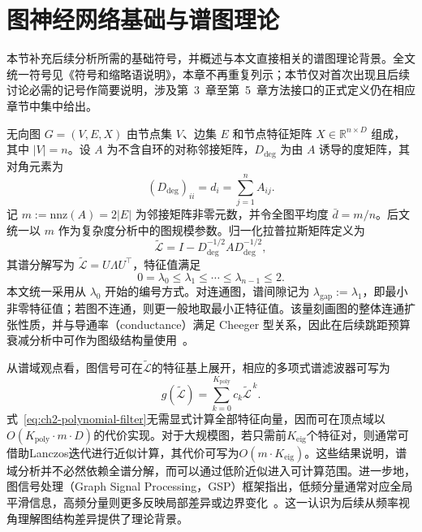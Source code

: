 \section{图神经网络基础与谱图理论}
\label{sec:ch2-gnn-basics}

本节补充后续分析所需的基础符号，并概述与本文直接相关的谱图理论背景。全文统一符号见《符号和缩略语说明》，本章不再重复列示；本节仅对首次出现且后续讨论必需的记号作简要说明，涉及第~3~章至第~5~章方法接口的正式定义仍在相应章节中集中给出。

无向图 \(G=(V,E,X)\) 由节点集 \(V\)、边集 \(E\) 和节点特征矩阵
\(X\in\mathbb{R}^{n\times D}\) 组成，其中 \(|V|=n\)。设 \(A\) 为不含自环的对称邻接矩阵，\(D_{\mathrm{deg}}\) 为由 \(A\) 诱导的度矩阵，其对角元素为
\begin{equation}
  (D_{\mathrm{deg}})_{ii}=d_i=\sum_{j=1}^{n} A_{ij}.
  \label{eq:ch2-degree-matrix}
\end{equation}
记 \(m:=\mathrm{nnz}(A)=2|E|\) 为邻接矩阵非零元数，并令全图平均度
\(\bar d=m/n\)。后文统一以 \(m\) 作为复杂度分析中的图规模参数。归一化拉普拉斯矩阵定义为\label{idx:theme:normlaplacian}
\begin{equation}
  \tilde{\mathcal{L}} = I - D_{\mathrm{deg}}^{-1/2} A D_{\mathrm{deg}}^{-1/2},
  \label{eq:ch2-normlaplacian}
\end{equation}
其谱分解写为 \(\tilde{\mathcal{L}}=U\Lambda U^\top\)，特征值满足
\begin{equation}
  0=\lambda_0\le \lambda_1\le \cdots \le \lambda_{n-1}\le 2.
  \label{eq:ch2-laplacian-spectrum-range}
\end{equation}
本文统一采用从 \(\lambda_0\) 开始的编号方式。对连通图，谱间隙记为
\(\lambda_{\mathrm{gap}}:=\lambda_1\)，即最小非零特征值；若图不连通，则更一般地取最小正特征值。该量刻画图的整体连通扩张性质，并与导通率（conductance）满足 Cheeger 型关系，因此在后续跳距预算衰减分析中可作为图级结构量使用~\cite{anderson1985eigenvalues,AlonMilman1985,Chung1997}。

从谱域观点看，图信号可在$\tilde{\mathcal{L}}$的特征基上展开，相应的多项式谱滤波器可写为
\begin{equation}
  g(\tilde{\mathcal{L}})=\sum_{k=0}^{K_{\mathrm{poly}}} c_k \tilde{\mathcal{L}}^{\,k}.
  \label{eq:ch2-polynomial-filter}
\end{equation}
式~\eqref{eq:ch2-polynomial-filter}无需显式计算全部特征向量，因而可在顶点域以$O(K_{\mathrm{poly}}\cdot m\cdot D)$的代价实现。对于大规模图，若只需前$K_{\mathrm{eig}}$个特征对，则通常可借助Lanczos迭代进行近似计算，其代价可写为$O(m\cdot K_{\mathrm{eig}})$。这些结果说明，谱域分析并不必然依赖全谱分解，而可以通过低阶近似进入可计算范围。进一步地，图信号处理（Graph Signal Processing，GSP）框架指出，低频分量通常对应全局平滑信息，高频分量则更多反映局部差异或边界变化~\cite{Shuman2013GSP,Ortega2018GSP}。这一认识为后续从频率视角理解图结构差异提供了理论背景。

